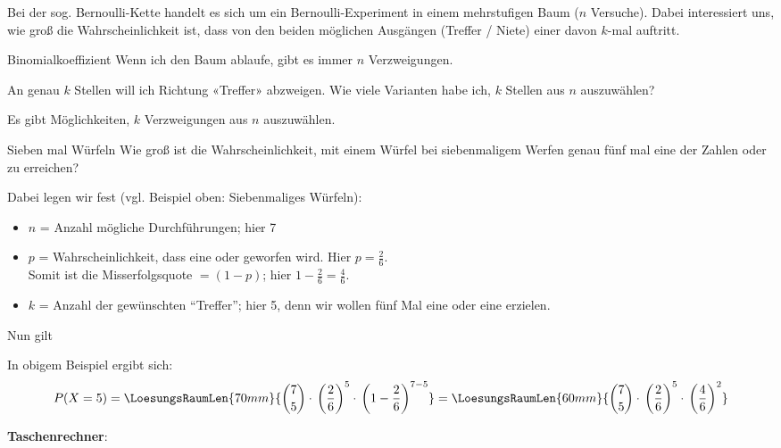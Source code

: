 Bei der sog. Bernoulli-Kette handelt es sich um ein
Bernoulli-Experiment
in einem mehrstufigen Baum ($n$ Versuche). Dabei interessiert
uns, wie groß die Wahrscheinlichkeit ist, dass von den beiden
möglichen Ausgängen (Treffer / Niete) einer davon $k$-mal auftritt.

\begin{bemerkung}{Binomialkoeffizient}{}
  Wenn ich den Baum ablaufe, gibt es immer $n$ Verzweigungen.

  An genau $k$
Stellen will ich Richtung «Treffer» abzweigen. Wie viele Varianten
habe ich, $k$ Stellen aus $n$ auszuwählen?

\vspace{4mm}

Es gibt  Möglichkeiten, $k$ Verzweigungen aus
$n$ auszuwählen.
\end{bemerkung}

\newpage
\begin{beispiel}{Sieben mal Würfeln}{}
Wie groß ist die Wahrscheinlichkeit, mit einem Würfel bei
siebenmaligem Werfen genau fünf mal eine der Zahlen  oder
 zu erreichen?
\end{beispiel}
Dabei legen wir fest (vgl. Beispiel oben: Siebenmaliges Würfeln):
\begin{itemize}

\item
  $n$ = Anzahl mögliche Durchführungen; hier 7

\item
  $p$ = Wahrscheinlichkeit, dass eine  oder 
  geworfen wird. Hier $p = \frac26$.\\
  Somit ist die Misserfolgsquote $= (1-p)$; hier $1-\frac26=\frac46$.


\item
  $k$ = Anzahl der gewünschten ``Treffer''; hier 5, denn wir wollen fünf
Mal eine  oder eine  erzielen.
\end{itemize}

Nun gilt

In obigem Beispiel ergibt sich:
\vspace{2mm}
$$P(X=5) = \LoesungsRaumLen{70mm}{{7\choose 5} \cdot{}
  \left(\frac26\right)^5 \cdot{} \left(1-\frac26\right)^{7-5}} =
\LoesungsRaumLen{60mm}{{7\choose 5} \cdot{} \left(\frac26\right)^5
  \cdot{} \left(\frac46\right)^2}$$


\textbf{Taschenrechner}:

\leserluft

